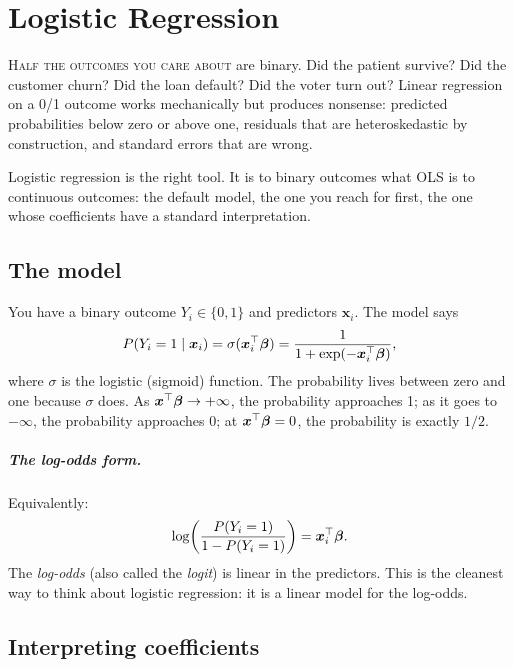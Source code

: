 \chapter{Logistic Regression}
\label{ch:logistic}

\noindent\textsc{Half the outcomes you care about} are binary. Did the patient survive? Did the customer churn? Did the loan default? Did the voter turn out? Linear regression on a 0/1 outcome works mechanically but produces nonsense: predicted probabilities below zero or above one, residuals that are heteroskedastic by construction, and standard errors that are wrong.

Logistic regression is the right tool. It is to binary outcomes what OLS is to continuous outcomes: the default model, the one you reach for first, the one whose coefficients have a standard interpretation.

\section{The model}

You have a binary outcome $Y_i \in \{0, 1\}$ and predictors $\bm{x}_i$. The model says
\begin{equation}
  P(Y_i = 1 \mid \bm{x}_i) = \sigma(\bm{x}_i^\top \bm{\beta}) = \frac{1}{1 + \exp(-\bm{x}_i^\top \bm{\beta})},
  \label{eq:logistic-model}
\end{equation}
where $\sigma$ is the logistic (sigmoid) function. The probability lives between zero and one because $\sigma$ does. As $\bm{x}^\top \bm{\beta} \to +\infty$, the probability approaches 1; as it goes to $-\infty$, the probability approaches 0; at $\bm{x}^\top\bm{\beta} = 0$, the probability is exactly $1/2$.

\paragraph{The log-odds form.} Equivalently:
\begin{equation}
  \log\!\left(\frac{P(Y_i=1)}{1 - P(Y_i=1)}\right) = \bm{x}_i^\top \bm{\beta}.
  \label{eq:log-odds}
\end{equation}
The \emph{log-odds} (also called the \emph{logit}) is linear in the predictors. This is the cleanest way to think about logistic regression: it is a linear model for the log-odds.

\section{Interpreting coefficients}

